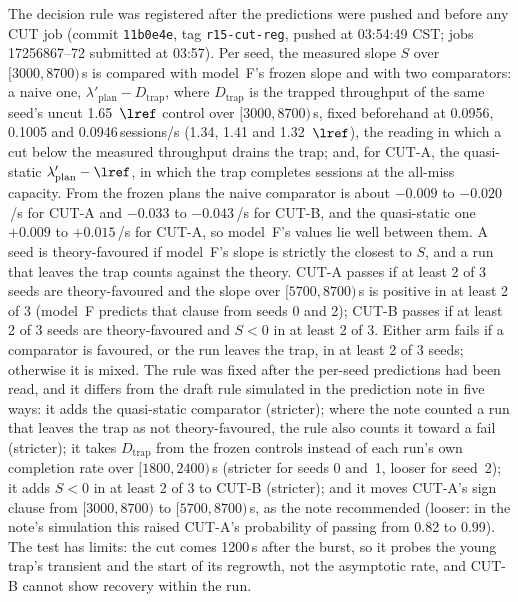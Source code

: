 \begin{itemize}[leftmargin=*,nosep]
The decision rule was registered after the predictions were pushed and before any CUT job (commit \texttt{11b0e4e}, tag
\texttt{r15-cut-reg}, pushed at 03:54:49 CST; jobs 17256867--72 submitted at 03:57). Per seed, the measured slope $S$ over
$[3000,8700)$\,s is compared with model~F's frozen slope and with two comparators: a naive one,
$\lambda'_{\mathrm{plan}}-D_{\mathrm{trap}}$, where $D_{\mathrm{trap}}$ is the trapped throughput of the same seed's uncut 1.65~$\lref$
control over $[3000,8700)$\,s, fixed beforehand at 0.0956, 0.1005 and 0.0946\,sessions/s (1.34, 1.41 and 1.32~$\lref$), the reading
in which a cut below the measured throughput drains the trap; and, for CUT-A, the quasi-static $\lambda'_{\mathrm{plan}}-\lref$, in
which the trap completes sessions at the all-miss capacity. From the frozen plans the naive comparator is about $-0.009$ to
$-0.020$\,/s for CUT-A and $-0.033$ to $-0.043$\,/s for CUT-B, and the quasi-static one $+0.009$ to $+0.015$\,/s for CUT-A, so model~F's
values lie well between them. A seed is theory-favoured if model~F's slope is strictly the closest to $S$, and a run that leaves the
trap counts against the theory. CUT-A passes if at least 2 of 3 seeds are theory-favoured and the slope over $[5700,8700)$\,s is
positive in at least 2 of 3 (model~F predicts that clause from seeds 0 and 2); CUT-B passes if at least 2 of 3 seeds are
theory-favoured and $S<0$ in at least 2 of 3. Either arm fails if a comparator is favoured, or the run leaves the trap, in at least
2 of 3 seeds; otherwise it is mixed. The
rule was fixed after the per-seed predictions had been read, and it differs from the draft rule simulated in the prediction note in
five ways: it adds the quasi-static comparator (stricter); where the note counted a run that leaves the trap as not
theory-favoured, the rule also counts it toward a fail (stricter); it takes $D_{\mathrm{trap}}$ from the frozen controls instead of
each run's own completion rate over $[1800,2400)$\,s (stricter for seeds 0 and~1, looser for seed~2); it adds $S<0$ in at least 2 of
3 to CUT-B (stricter); and it moves CUT-A's sign clause from $[3000,8700)$ to $[5700,8700)$\,s, as the note recommended (looser: in
the note's simulation this raised CUT-A's probability of passing from 0.82 to 0.99). The test has limits: the cut comes 1200\,s
after the burst, so it probes the young trap's transient and the start of its regrowth, not the asymptotic rate, and CUT-B cannot
show recovery within the run.


\end{itemize}
